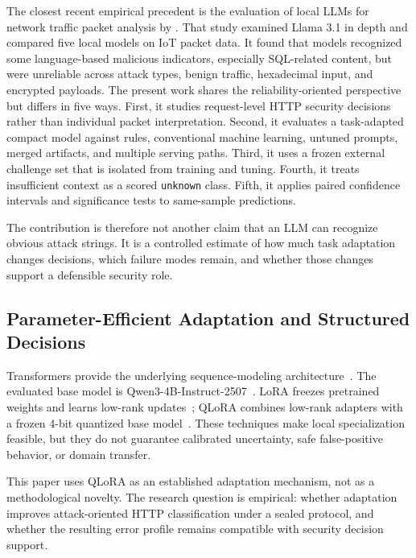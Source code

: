 The closest recent empirical precedent is the evaluation of local LLMs for network traffic packet analysis by \citet{paukkeri2026local}. That study examined Llama 3.1 in depth and compared five local models on IoT packet data. It found that models recognized some language-based malicious indicators, especially SQL-related content, but were unreliable across attack types, benign traffic, hexadecimal input, and encrypted payloads. The present work shares the reliability-oriented perspective but differs in five ways. First, it studies request-level HTTP security decisions rather than individual packet interpretation. Second, it evaluates a task-adapted compact model against rules, conventional machine learning, untuned prompts, merged artifacts, and multiple serving paths. Third, it uses a frozen external challenge set that is isolated from training and tuning. Fourth, it treats insufficient context as a scored \texttt{unknown} class. Fifth, it applies paired confidence intervals and significance tests to same-sample predictions.

The contribution is therefore not another claim that an LLM can recognize obvious attack strings. It is a controlled estimate of how much task adaptation changes decisions, which failure modes remain, and whether those changes support a defensible security role.

\subsection{Parameter-Efficient Adaptation and Structured Decisions}
Transformers provide the underlying sequence-modeling architecture~\citep{vaswani2017attention}. The evaluated base model is Qwen3-4B-Instruct-2507~\citep{qwen3,qwen2507}. LoRA freezes pretrained weights and learns low-rank updates~\citep{hu2021lora}; QLoRA combines low-rank adapters with a frozen 4-bit quantized base model~\citep{dettmers2023qlora}. These techniques make local specialization feasible, but they do not guarantee calibrated uncertainty, safe false-positive behavior, or domain transfer.

This paper uses QLoRA as an established adaptation mechanism, not as a methodological novelty. The research question is empirical: whether adaptation improves attack-oriented HTTP classification under a sealed protocol, and whether the resulting error profile remains compatible with security decision support.

